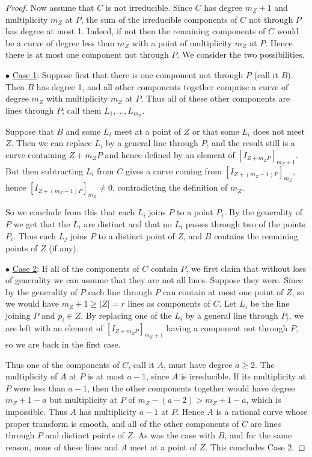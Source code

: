 \documentclass[12pt]{amsart}
\numberwithin{equation}{section}
\theoremstyle{definition}
\begin{document}
\begin{proof}
Now assume that $C$ is not irreducible. Since $C$ has degree $m_Z+1$ and multiplicity $m_Z$ at $P$,
the sum of the irreducible components of $C$ not through $P$ has degree at most 1. Indeed, if not then  the remaining components of $C$ would be a curve of degree less than $m_Z$ with a point
of multiplicity $m_Z$ at $P$. Hence there is at most
one component not through $P$. We consider the two possibilities.

\medskip

\noindent $\bullet$ \underline{Case 1}:  Suppose first that there is one  component not through $P$ (call it $B$). Then $B$ has degree 1, and all other components together comprise a curve of degree
$m_Z$ with multiplicity $m_Z$ at $P$. Thus all of these other components are lines through $P$; call them $L_1,\ldots,L_{m_Z}$.

Suppose that  $B$ and some $L_i$ meet at a point of $Z$ or that some $L_i$ does not meet $Z$. Then we can replace $L_i$ by a general line through $P$, and the result still is a curve containing $Z+m_ZP$ and hence 
defined by an element of $[I_{Z+m_ZP}]_{m_Z+1}$. But then subtracting $L_i$ from $C$
gives a curve coming from $[I_{Z+(m_Z-1)P}]_{m_Z}$, hence 
$[I_{Z+(m_Z-1)P}]_{m_Z}\neq0$, contradicting the definition of $m_Z$.

So we conclude from this that each $L_i$ joins $P$ to a point $P_i$. By the generality of $P$ we get that the $L_i$ are distinct and that no $L_i$ passes through two of the points $P_i$.
Thus each $L_j$ joins $P$ to 
 a distinct point of $Z$, and $B$ contains the remaining
points of $Z$ (if any).  

\medskip

\noindent $\bullet$ \underline{Case 2}: If all of the components of $C$ contain $P$, we first claim that without loss of generality we can assume that they are not all  lines. Suppose they were.
Since by the generality of $P$ each line through $P$ can contain at most one point of $Z$, so we would have 
$m_Z+1\geq |Z|=r$ lines as components of $C$. Let $L_i$ be the line joining $P$ and
$p_i\in Z$. 
By replacing one of the $L_i$ by a general line through $P_i$, we are left with an element of $[I_{Z + m_ZP}]_{m_Z+1}$ having a component not through $P$, so we are back in the first case. 

Thus one of the components of $C$, call it $A$, must have degree $a\geq 2$. The multiplicity of $A$
at $P$ is at most $a-1$, since $A$ is irreducible. If its multiplicity at $P$ were less than $a-1$, then
the other components together would have degree $m_Z+1-a$ but multiplicity at $P$ of $m_Z-(a-2)>m_Z+1-a$,
which is impossible. Thus $A$ has multiplicity $a-1$ at $P$.  Hence $A$ is a rational curve whose proper transform
is smooth, and all of the other components of $C$ are lines through $P$ and distinct points of $Z$.
As was the case with $B$, and for the same reason, none of these lines and $A$ meet at a point of
$Z$. This concludes Case 2.


\end{proof}
\end{document}
